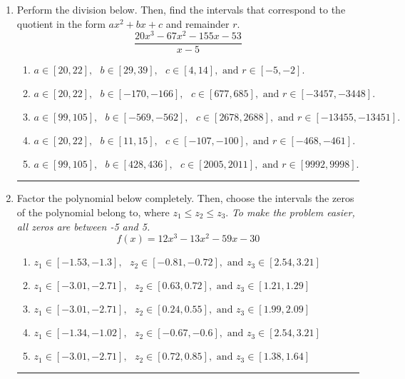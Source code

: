 \documentclass[14pt]{extbook}
\newcommand{\litem}[1]{\item#1\hspace*{-1cm}\rule{\textwidth}{0.4pt}}
\begin{document}
\begin{enumerate}
{\begin{enumerate}[label=\Alph*.]
\end{enumerate} }
\litem{
Perform the division below. Then, find the intervals that correspond to the quotient in the form $ax^2+bx+c$ and remainder $r$.\[ \frac{20x^{3} -67 x^{2} -155 x -53}{x -5} \]\begin{enumerate}[label=\Alph*.]
\item \( a \in [20, 22], \text{   } b \in [29, 39], \text{   } c \in [4, 14], \text{   and   } r \in [-5, -2]. \)
\item \( a \in [20, 22], \text{   } b \in [-170, -166], \text{   } c \in [677, 685], \text{   and   } r \in [-3457, -3448]. \)
\item \( a \in [99, 105], \text{   } b \in [-569, -562], \text{   } c \in [2678, 2688], \text{   and   } r \in [-13455, -13451]. \)
\item \( a \in [20, 22], \text{   } b \in [11, 15], \text{   } c \in [-107, -100], \text{   and   } r \in [-468, -461]. \)
\item \( a \in [99, 105], \text{   } b \in [428, 436], \text{   } c \in [2005, 2011], \text{   and   } r \in [9992, 9998]. \)

\end{enumerate} }
\litem{
Factor the polynomial below completely. Then, choose the intervals the zeros of the polynomial belong to, where $z_1 \leq z_2 \leq z_3$. \textit{To make the problem easier, all zeros are between -5 and 5.}\[ f(x) = 12x^{3} -13 x^{2} -59 x -30 \]\begin{enumerate}[label=\Alph*.]
\item \( z_1 \in [-1.53, -1.3], \text{   }  z_2 \in [-0.81, -0.72], \text{   and   } z_3 \in [2.54, 3.21] \)
\item \( z_1 \in [-3.01, -2.71], \text{   }  z_2 \in [0.63, 0.72], \text{   and   } z_3 \in [1.21, 1.29] \)
\item \( z_1 \in [-3.01, -2.71], \text{   }  z_2 \in [0.24, 0.55], \text{   and   } z_3 \in [1.99, 2.09] \)
\item \( z_1 \in [-1.34, -1.02], \text{   }  z_2 \in [-0.67, -0.6], \text{   and   } z_3 \in [2.54, 3.21] \)
\item \( z_1 \in [-3.01, -2.71], \text{   }  z_2 \in [0.72, 0.85], \text{   and   } z_3 \in [1.38, 1.64] \)

\end{enumerate} }
\end{enumerate}
\end{document}
